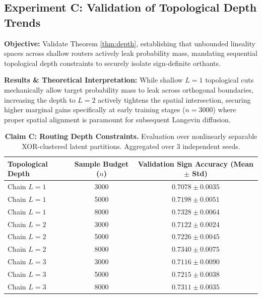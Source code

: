 \documentclass{article}
\newcommand{\1}{\mathbb{I}}
\begin{document}
\subsection{Experiment C: Validation of Topological Depth Trends}
\label{app:expc}

\textbf{Objective:} Validate Theorem \ref{thm:depth}, establishing that unbounded lineality spaces across shallow routers actively leak probability mass, mandating sequential topological depth constraints to securely isolate sign-definite orthants.

\textbf{Results \& Theoretical Interpretation:} While shallow $L=1$ topological cuts mechanically allow target probability mass to leak across orthogonal boundaries, increasing the depth to $L=2$ actively tightens the spatial intersection, securing higher marginal gains specifically at early training stages ($n=3000$) where proper spatial alignment is paramount for subsequent Langevin diffusion.

\begin{table}[H]
\centering
\caption{\textbf{Claim C: Routing Depth Constraints.} Evaluation over nonlinearly separable XOR-clustered latent partitions. Aggregated over 3 independent seeds.}
\label{tab:exp_c_full}
\begin{tabular}{lS[table-format=4.0]c}
\toprule
\textbf{Topological Depth} & {\textbf{Sample Budget ($n$)}} & \textbf{Validation Sign Accuracy (Mean $\pm$ Std)} \\
\midrule
Chain $L=1$ & 3000 & $0.7078 \pm 0.0035$ \\
Chain $L=1$ & 5000 & $0.7198 \pm 0.0051$ \\
Chain $L=1$ & 8000 & $0.7328 \pm 0.0064$ \\
\midrule
Chain $L=2$ & 3000 & $0.7122 \pm 0.0024$ \\
Chain $L=2$ & 5000 & $0.7226 \pm 0.0045$ \\
Chain $L=2$ & 8000 & $0.7340 \pm 0.0075$ \\
\midrule
Chain $L=3$ & 3000 & $0.7116 \pm 0.0090$ \\
Chain $L=3$ & 5000 & $0.7215 \pm 0.0038$ \\
Chain $L=3$ & 8000 & $0.7311 \pm 0.0035$ \\
\bottomrule
\end{tabular}
\end{table}

\end{document}

